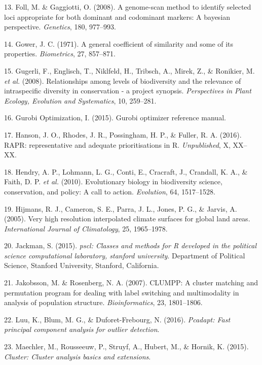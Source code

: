 \documentclass[11pt,]{article}
\begin{document}
\hypertarget{ref-r456}{}
13. Foll, M. \& Gaggiotti, O. (2008). A genome-scan method to identify
selected loci appropriate for both dominant and codominant markers: A
bayesian perspective. \emph{Genetics}, 180, 977--993.

\hypertarget{ref-r464}{}
14. Gower, J. C. (1971). A general coefficient of similarity and some of
its properties. \emph{Biometrics}, 27, 857--871.

\hypertarget{ref-r452}{}
15. Gugerli, F., Englisch, T., Niklfeld, H., Tribsch, A., Mirek, Z., \&
Ronikier, M. \emph{et al.} (2008). Relationships among levels of
biodiversity and the relevance of intraspecific diversity in
conservation - a project synopsis. \emph{Perspectives in Plant Ecology,
Evolution and Systematics}, 10, 259--281.

\hypertarget{ref-r463}{}
16. Gurobi Optimization, I. (2015). Gurobi optimizer reference manual.

\hypertarget{ref-r465}{}
17. Hanson, J. O., Rhodes, J. R., Possingham, H. P., \& Fuller, R. A.
(2016). RAPR: representative and adequate prioritisations in R.
\emph{Unpublished}, X, XX--XX.

\hypertarget{ref-r61}{}
18. Hendry, A. P., Lohmann, L. G., Conti, E., Cracraft, J., Crandall, K.
A., \& Faith, D. P. \emph{et al.} (2010). Evolutionary biology in
biodiversity science, conservation, and policy: A call to action.
\emph{Evolution}, 64, 1517--1528.

\hypertarget{ref-r33}{}
19. Hijmans, R. J., Cameron, S. E., Parra, J. L., Jones, P. G., \&
Jarvis, A. (2005). Very high resolution interpolated climate surfaces
for global land areas. \emph{International Journal of Climatology}, 25,
1965--1978.

\hypertarget{ref-r492}{}
20. Jackman, S. (2015). \emph{pscl: Classes and methods for R developed
in the political science computational laboratory, stanford university}.
Department of Political Science, Stanford University, Stanford,
California.

\hypertarget{ref-r459}{}
21. Jakobsson, M. \& Rosenberg, N. A. (2007). CLUMPP: A cluster matching
and permutation program for dealing with label switching and
multimodality in analysis of population structure.
\emph{Bioinformatics}, 23, 1801--1806.

\hypertarget{ref-r496}{}
22. Luu, K., Blum, M. G., \& Duforet-Frebourg, N. (2016). \emph{Pcadapt:
Fast principal component analysis for outlier detection}.

\hypertarget{ref-r457}{}
23. Maechler, M., Rousseeuw, P., Struyf, A., Hubert, M., \& Hornik, K.
(2015). \emph{Cluster: Cluster analysis basics and extensions}.
\end{document}
